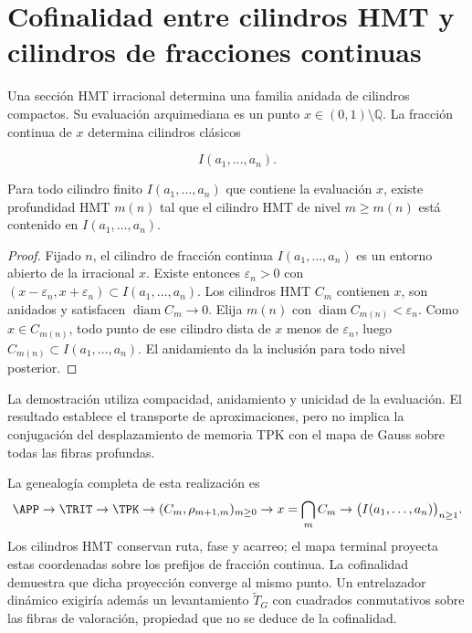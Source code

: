 \label{ch:gauss}

\section{Cofinalidad entre cilindros HMT y cilindros de fracciones continuas}

Una secci\'on HMT irracional determina una familia anidada de cilindros compactos. Su evaluaci\'on arquimediana es un punto \(x\in(0,1)\setminus\mathbb Q\). La fracci\'on continua de \(x\) determina cilindros cl\'asicos

\[
I(a_1,\ldots,a_n).
\]

\begin{proposition}[Cofinalidad]
Para todo cilindro finito \(I(a_1,\ldots,a_n)\) que contiene la evaluaci\'on \(x\), existe profundidad HMT \(m(n)\) tal que el cilindro HMT de nivel \(m\ge m(n)\) est\'a contenido en \(I(a_1,\ldots,a_n)\).
\end{proposition}

\begin{proof}
Fijado \(n\), el cilindro de fracci\'on continua \(I(a_1,\ldots,a_n)\) es un entorno abierto de la irracional \(x\). Existe entonces \(\varepsilon_n>0\) con \((x-\varepsilon_n,x+\varepsilon_n)\subset I(a_1,\ldots,a_n)\). Los cilindros HMT \(C_m\) contienen \(x\), son anidados y satisfacen \(\operatorname{diam}C_m\to0\). Elija \(m(n)\) con \(\operatorname{diam}C_{m(n)}<\varepsilon_n\). Como \(x\in C_{m(n)}\), todo punto de ese cilindro dista de \(x\) menos de \(\varepsilon_n\), luego \(C_{m(n)}\subset I(a_1,\ldots,a_n)\). El anidamiento da la inclusi\'on para todo nivel posterior.
\end{proof}

La demostraci\'on utiliza compacidad, anidamiento y unicidad de la
evaluaci\'on. El resultado establece el transporte de aproximaciones, pero
no implica la conjugaci\'on del desplazamiento de memoria TPK con el mapa de
Gauss sobre todas las fibras profundas.

La genealog\'ia completa de esta realizaci\'on es
\[
\APP\to\TRIT\to\TPK
\to (C_m,\rho_{m+1,m})_{m\ge0}
\to x=\bigcap_m C_m
\to \bigl(I(a_1,\ldots,a_n)\bigr)_{n\ge1}.
\]
Los cilindros HMT conservan ruta, fase y acarreo; el mapa terminal proyecta
estas coordenadas sobre los prefijos de fracci\'on continua. La cofinalidad
demuestra que dicha proyecci\'on converge al mismo punto. Un entrelazador
din\'amico exigir\'ia adem\'as un levantamiento \(\widetilde T_G\) con
cuadrados conmutativos sobre las fibras de valoraci\'on, propiedad que no se
deduce de la cofinalidad.

